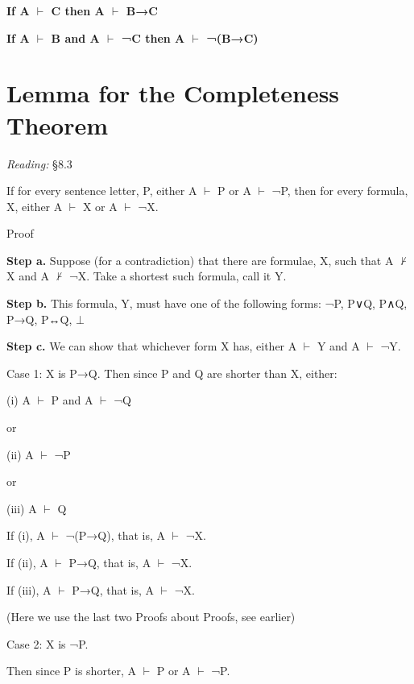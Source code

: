 \documentclass[12pt]{extarticle}
\begin{document}
\begin{multicols*}{3}
\textbf{If A $\vdash$ C then A $\vdash$ B→C}
 
\textbf{If A $\vdash$ B and A $\vdash$ ¬C then A $\vdash$ ¬(B→C)}
 
 
 
\section{Lemma for the Completeness Theorem}
 
\emph{Reading:} §8.3
 
 
If for every sentence letter, P, either A $\vdash$ P or A $\vdash$ ¬P, then for every formula, X, either A $\vdash$ X or A $\vdash$ ¬X.
 
Proof
 
\textbf{Step a.} Suppose (for a contradiction) that there are formulae, X, such that A $\nvdash$ X and A $\nvdash$ ¬X. Take a shortest such formula, call it Y.
 
\textbf{Step b.} This formula, Y, must have one of the following forms: ¬P, P∨Q, P∧Q, P→Q, P↔Q, $\bot$
 
\textbf{Step c.} We can show that whichever form X has, either A $\vdash$ Y and A $\vdash$ ¬Y.
 
Case 1: X is P→Q. Then since P and Q are shorter than X, either:
 
\hspace{5mm} (i) A $\vdash$ P and A $\vdash$ ¬Q
 
\hspace{5mm} or
 
\hspace{5mm} (ii) A $\vdash$ ¬P
 
\hspace{5mm} or
 
\hspace{5mm} (iii) A $\vdash$ Q
 
\hspace{5mm} If (i), A $\vdash$ ¬(P→Q), that is, A $\vdash$ ¬X.
 
\hspace{5mm} If (ii), A $\vdash$ P→Q, that is, A $\vdash$ ¬X.
 
\hspace{5mm} If (iii), A $\vdash$ P→Q, that is, A $\vdash$ ¬X.
 
\hspace{5mm} (Here we use the last two Proofs about Proofs, see earlier)
 
Case 2: X is ¬P.
 
\hspace{5mm} Then since P is shorter, A $\vdash$ P or A $\vdash$ ¬P.
 

\end{multicols*}
\end{document}
